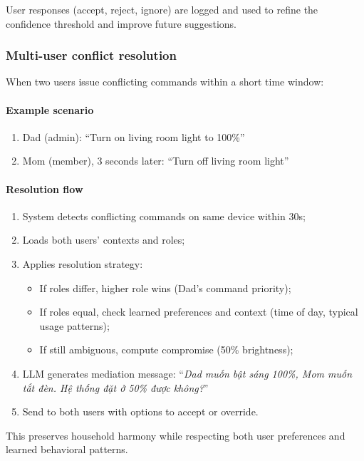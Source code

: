 User responses (accept, reject, ignore) are logged and used to refine the
confidence threshold and improve future suggestions.

\subsubsection{Multi-user conflict resolution}

When two users issue conflicting commands within a short time window:

\paragraph{Example scenario}
\begin{enumerate}
    \item Dad (admin): ``Turn on living room light to 100\%''
    \item Mom (member), 3 seconds later: ``Turn off living room light''
\end{enumerate}

\paragraph{Resolution flow}
\begin{enumerate}
    \item System detects conflicting commands on same device within 30s;
    \item Loads both users' contexts and roles;
    \item Applies resolution strategy:
    \begin{itemize}
        \item If roles differ, higher role wins (Dad's command priority);
        \item If roles equal, check learned preferences and context
        (time of day, typical usage patterns);
        \item If still ambiguous, compute compromise (50\% brightness);
    \end{itemize}
    \item LLM generates mediation message: ``\emph{Dad muốn bật sáng 100\%,
    Mom muốn tắt đèn. Hệ thống đặt ở 50\% được không?}''
    \item Send to both users with options to accept or override.
\end{enumerate}

This preserves household harmony while respecting both user preferences
and learned behavioral patterns.

